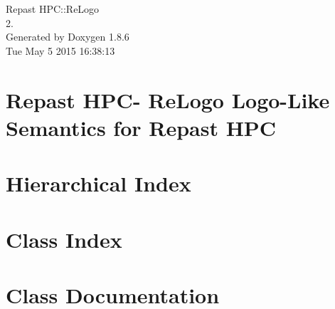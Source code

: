 \documentclass[twoside]{book}
\newcommand{\clearemptydoublepage}{%
  \newpage{\pagestyle{empty}\cleardoublepage}%
}
\begin{document}
\hypersetup{pageanchor=false}
\begin{titlepage}
\vspace*{7cm}
\begin{center}%
{\Large Repast H\-P\-C\-:\-:Re\-Logo \\[1ex]\large 2. }\\
\vspace*{1cm}
{\large Generated by Doxygen 1.8.6}\\
\vspace*{0.5cm}
{\small Tue May 5 2015 16:38:13}\\
\end{center}
\end{titlepage}
\clearemptydoublepage
\tableofcontents
\clearemptydoublepage
{}
\hypersetup{pageanchor=true}

\chapter{Repast H\-P\-C-\/ Re\-Logo Logo-\/\-Like Semantics for Repast H\-P\-C}
\label{index}\hypertarget{index}{}
\chapter{Hierarchical Index}

\chapter{Class Index}

\chapter{Class Documentation}


























\newpage
{}
{}
\printindex
\end{document}
